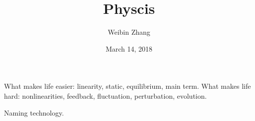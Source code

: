 \documentclass[12pt]{report}
\title{Physcis}
\author{Weibin Zhang}
\date{March 14, 2018}
\begin{document}
\maketitle

\tableofcontents
What makes life easier: linearity, static, equilibrium, main term.
What makes life hard: nonlinearities, feedback, fluctuation, perturbation,
evolution.



















Naming technology.
\end{document}
